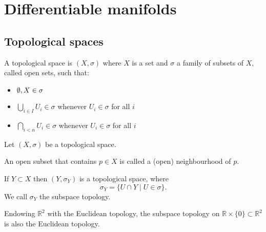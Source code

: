 
\chapter{Differentiable manifolds}
\setcounter{section}{-1}
\section{Topological spaces}

\begin{definition}
    A topological space is $(X, \sigma)$ where  $X$ is a set and $\sigma$
  a family of subsets of $X$, called  open sets, such that:
    \begin{itemize}
        \item $\emptyset, X \in \sigma$ 
        \item $\bigcup_{i \in I} U_i \in \sigma$ whenever $ U_i \in \sigma$ for all $i$
        \item $\bigcap_{i<n} U_i \in \sigma$ whenever $ U_i \in \sigma$ for all $i$
    \end{itemize}
\end{definition}

Let $(X, \sigma)$ be a topological space.
\begin{definition}
    An open subset that contains $p \in X$ is called a (open) neighbourhood of $p$.
\end{definition}
\begin{definition}
    If $Y \subset X$ then $(Y, \sigma_Y)$ is a topological space, where
    \[
    \sigma_Y = \{U \cap Y  \mid  U \in \sigma\} 
    .\]  We call $\sigma_Y$ the subspace topology.
\end{definition}
\begin{eg}
Endowing $\mathbb{R}^2$ with the Euclidean topology,
the subspace topology on    $\mathbb R \times \{0\}\subset \mathbb{R}^2$ is also the
 Euclidean topology.
\end{eg}

